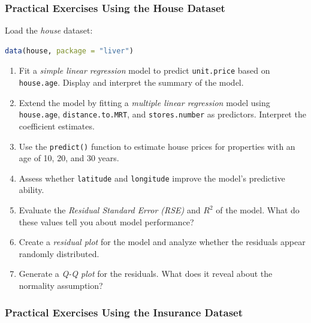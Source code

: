 \documentclass[
]{book}
\newcommand{\passthrough}[1]{#1}
\providecommand{\tightlist}{%
  \setlength{\itemsep}{0pt}\setlength{\parskip}{0pt}}
\theoremstyle{definition}
\theoremstyle{definition}
\theoremstyle{definition}
\theoremstyle{definition}
\theoremstyle{remark}
\begin{document}
\subsubsection*{Practical Exercises Using the House Dataset}\label{practical-exercises-using-the-house-dataset}

Load the \emph{house} dataset:

\begin{lstlisting}[language=R]
data(house, package = "liver")
\end{lstlisting}

\begin{enumerate}
\def\labelenumi{\arabic{enumi}.}
\setcounter{enumi}{7}
\tightlist
\item
  Fit a \emph{simple linear regression} model to predict \passthrough{\lstinline!unit.price!} based on \passthrough{\lstinline!house.age!}. Display and interpret the summary of the model.\\
\item
  Extend the model by fitting a \emph{multiple linear regression} model using \passthrough{\lstinline!house.age!}, \passthrough{\lstinline!distance.to.MRT!}, and \passthrough{\lstinline!stores.number!} as predictors. Interpret the coefficient estimates.\\
\item
  Use the \passthrough{\lstinline!predict()!} function to estimate house prices for properties with an age of 10, 20, and 30 years.\\
\item
  Assess whether \passthrough{\lstinline!latitude!} and \passthrough{\lstinline!longitude!} improve the model's predictive ability.\\
\item
  Evaluate the \emph{Residual Standard Error (RSE)} and \emph{\(R^2\)} of the model. What do these values tell you about model performance?\\
\item
  Create a \emph{residual plot} for the model and analyze whether the residuals appear randomly distributed.\\
\item
  Generate a \emph{Q-Q plot} for the residuals. What does it reveal about the normality assumption?
\end{enumerate}

\subsubsection*{Practical Exercises Using the Insurance Dataset}\label{practical-exercises-using-the-insurance-dataset}
\end{document}
